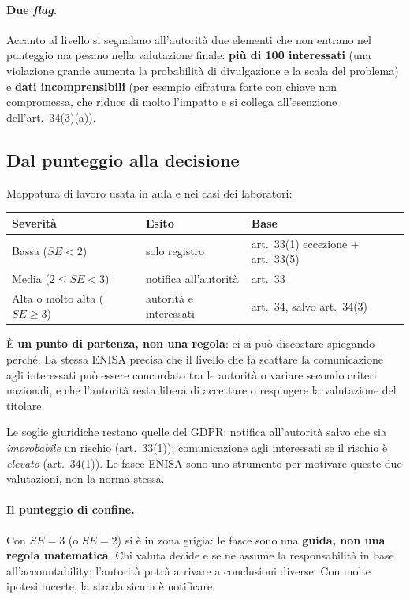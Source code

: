\paragraph{Due \emph{flag}.} Accanto al livello si segnalano all'autorità due elementi che non entrano
nel punteggio ma pesano nella valutazione finale: \textbf{più di 100 interessati} (una violazione grande
aumenta la probabilità di divulgazione e la scala del problema) e \textbf{dati incomprensibili} (per
esempio cifratura forte con chiave non compromessa, che riduce di molto l'impatto e si collega
all'esenzione dell'art.~34(3)(a)).

\subsection{Dal punteggio alla decisione}
\label{sec:breach-decisione}
Mappatura di lavoro usata in aula e nei casi dei laboratori:
\begin{center}
\small
\begin{tabular}{lll}
\toprule
\textbf{Severità} & \textbf{Esito} & \textbf{Base}\\
\midrule
Bassa ($SE<2$) & solo registro & art.~33(1) eccezione + art.~33(5)\\
Media ($2 \le SE < 3$) & notifica all'autorità & art.~33\\
Alta o molto alta ($SE \ge 3$) & autorità e interessati & art.~34, salvo art.~34(3)\\
\bottomrule
\end{tabular}
\end{center}
È \textbf{un punto di partenza, non una regola}: ci si può discostare spiegando perché. La stessa ENISA
precisa che il livello che fa scattare la comunicazione agli interessati può essere concordato tra le
autorità o variare secondo criteri nazionali, e che l'autorità resta libera di accettare o respingere la
valutazione del titolare.

\begin{integrazione}
Le soglie giuridiche restano quelle del GDPR: notifica all'autorità salvo che sia \emph{improbabile} un
rischio (art.~33(1)); comunicazione agli interessati se il rischio è \emph{elevato} (art.~34(1)). Le fasce
ENISA sono uno strumento per motivare queste due valutazioni, non la norma stessa.
\end{integrazione}

\paragraph{Il punteggio di confine.} Con $SE = 3$ (o $SE = 2$) si è in zona grigia: le fasce sono una
\textbf{guida, non una regola matematica}. Chi valuta decide e se ne assume la responsabilità in base
all'accountability; l'autorità potrà arrivare a conclusioni diverse. Con molte ipotesi incerte, la
strada sicura è notificare.

